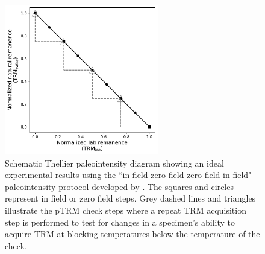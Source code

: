 \begin{figure}[h!]
    \centering
    \includegraphics[width=0.6\textwidth]{figure/IZZI_protocol.pdf}
    \caption[Schematic illustration of the IZZI paleointenstiy protocol]{Schematic Thellier paleointensity diagram showing an ideal experimental results using the ``in field-zero field-zero field-in field" paleointensity protocol developed by \citet{Yu2004a}. The squares and circles represent in field or zero field steps. Grey dashed lines and triangles illustrate the pTRM check steps where a repeat TRM acquisition step is performed to test for changes in a specimen's ability to acquire TRM at blocking temperatures below the temperature of the check. }
    \label{fig:IZZI_protocol}
\end{figure}

